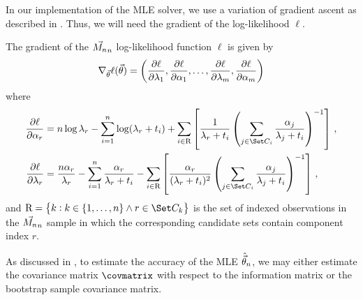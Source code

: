 \documentclass[../main.tex]{subfiles}
\begin{document}
In our implementation of the MLE solver, we use a variation of gradient ascent as described in . Thus, we will need the gradient of the log-likelihood $\ell$.
\begin{corollary*}
\label{cor:par_log_like_grad}
The gradient of the $\vec{M_n}_n$ log-likelihood function $\ell$ is given by
\begin{equation}
    \nabla_{\vec\theta} \ell(\vec\theta) = \left (
        \frac {\mathrm{\partial} \ell}{\mathrm{\partial}\lambda_1},
        \frac {\mathrm{\partial} \ell}{\mathrm{\partial}\alpha_1},
        \ldots,
        \frac {\mathrm{\partial} \ell}{\mathrm{\partial}\lambda_m},
        \frac {\mathrm{\partial} \ell}{\mathrm{\partial}\alpha_m}
    \right )
\end{equation}
where
\begin{align}
    \ppderivative{\ell}{\alpha_r} &=
        n \log \lambda_r -
        \sum_{i=1}^{n} \log(\lambda_r + t_i) +
        \sum_{i \in \mathrm{R}} \left [
            \frac{1}{\lambda_r + t_i} 
            \left (
                \sum_{j \in \cand_i} \frac{\alpha_j}{\lambda_j + t_i}
            \right )^{-1}
        \right ]\,,\\
    \ppderivative{\ell}{\lambda_r} &=
        \frac{n \alpha_r}{\lambda_r} -
        \sum_{i=1}^{n} \frac{\alpha_r}{\lambda_r + t_i} -
        \sum_{i \in \mathrm{R}} \left [
            \frac{\alpha_r}{(\lambda_r + t_i)^2}
            \left (
                \sum_{j \in \cand_i} \frac{\alpha_j}{\lambda_j + t_i}
            \right)^{-1}
        \right ]\,,
\end{align}
and $\mathrm{R} = \left \{ k : k \in \{1, \ldots, n \} \wedge r \in \cand_k \right \}$ is the set of indexed observations in the $\vec{M_n}_n$ sample in which the corresponding candidate sets contain component index $r$.
\end{corollary*}

As discussed in , to estimate the accuracy of the MLE $\hat{\vec\theta}_n$, we may either estimate the covariance matrix $\covmatrix$ with respect to the information matrix or the bootstrap sample covariance matrix.
\end{document}
